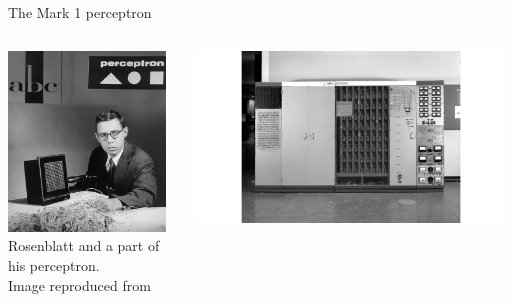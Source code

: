 \begin{frame}[t]{The Mark 1 perceptron}
    \begin{columns}[t]
        \begin{column}{0.25\textwidth}
         \begin{center}
            \includegraphics[width=0.95\textwidth]{./images/people/rosenblat_1.png}\\
            {\tiny 
            Rosenblatt and a part of his perceptron.\\
            \color{col:attribution} 
            Image reproduced from \cite{AIPlainEng:RiseAndFallOfPerceptron}\\}
         \end{center}
        \end{column}
        \begin{column}{0.50\textwidth}
            \begin{center}
                \includegraphics[width=0.98\textwidth]{./images/perceptron/mark1.png}\\

\end{center}
\end{column}
\end{columns}
\end{frame}
